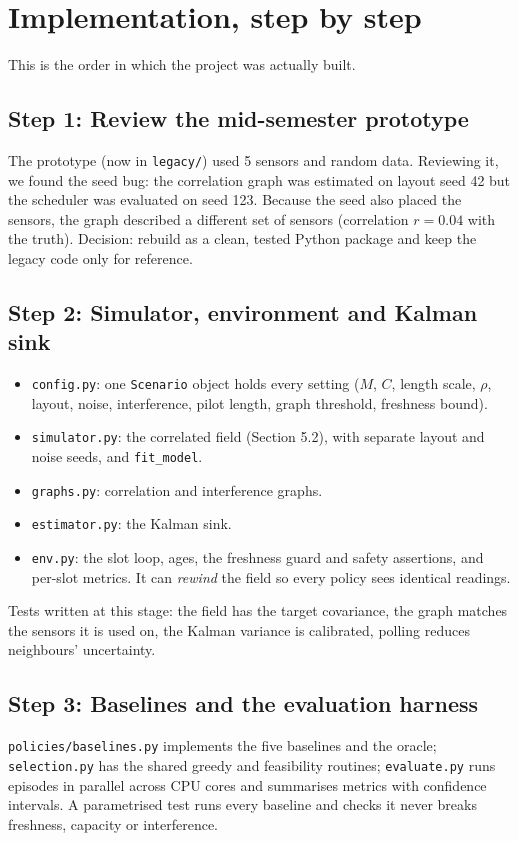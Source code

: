 \section{Implementation, step by step}

This is the order in which the project was actually built.

\subsection{Step 1: Review the mid-semester prototype}
The prototype (now in \texttt{legacy/}) used 5 sensors and random data. Reviewing it, we found the seed bug: the
correlation graph was estimated on layout seed 42 but the scheduler was evaluated on seed 123. Because the seed also
placed the sensors, the graph described a different set of sensors (correlation $r=0.04$ with the truth). Decision:
rebuild as a clean, tested Python package and keep the legacy code only for reference.

\subsection{Step 2: Simulator, environment and Kalman sink}
\begin{itemize}
  \item \texttt{config.py}: one \texttt{Scenario} object holds every setting ($M$, $C$, length scale, $\rho$, layout,
        noise, interference, pilot length, graph threshold, freshness bound).
  \item \texttt{simulator.py}: the correlated field (Section 5.2), with separate layout and noise seeds, and
        \texttt{fit\_model}.
  \item \texttt{graphs.py}: correlation and interference graphs.
  \item \texttt{estimator.py}: the Kalman sink.
  \item \texttt{env.py}: the slot loop, ages, the freshness guard and safety assertions, and per-slot metrics. It can
        \emph{rewind} the field so every policy sees identical readings.
\end{itemize}
Tests written at this stage: the field has the target covariance, the graph matches the sensors it is used on, the
Kalman variance is calibrated, polling reduces neighbours' uncertainty.

\subsection{Step 3: Baselines and the evaluation harness}
\texttt{policies/baselines.py} implements the five baselines and the oracle; \texttt{selection.py} has the shared
greedy and feasibility routines; \texttt{evaluate.py} runs episodes in parallel across CPU cores and summarises
metrics with confidence intervals. A parametrised test runs every baseline and checks it never breaks freshness,
capacity or interference.

